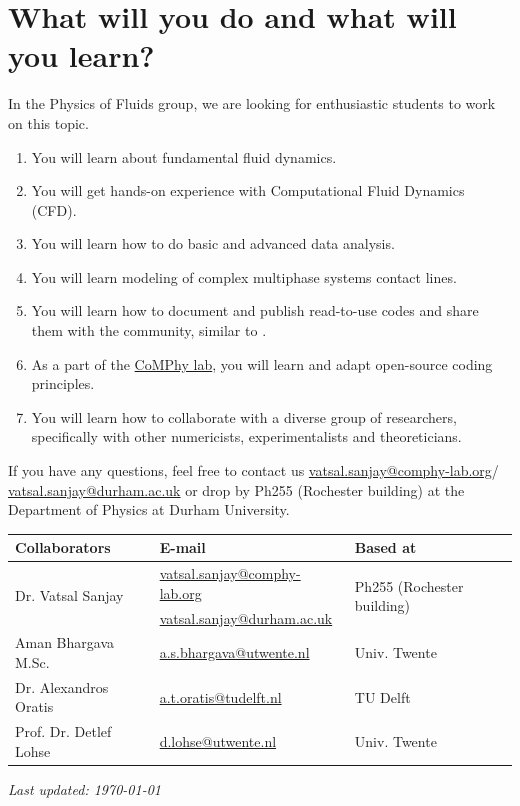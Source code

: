 \documentclass[11pt]{article}
\begin{document}
\section*{What will you do and what will you learn?}
In the Physics of Fluids group, we are looking for enthusiastic students to work on this topic.
\begin{enumerate}
\itemsep0em
\item You will learn about fundamental fluid dynamics.
\item You will get hands-on experience with Computational Fluid Dynamics (CFD).
\item You will learn how to do basic and advanced data analysis.
\item You will learn modeling of complex multiphase systems contact lines. 
\item You will learn how to document and publish read-to-use codes and share them with the community, similar to \citet{basiliskVatsal, basiliskVatsalDropFilm, basiliskVatsalViscousBouncing}. 
\item As a part of the \href{https://comphy-lab.org}{CoMPhy lab}, you will learn and adapt open-source coding principles. 
\item You will learn how to collaborate with a diverse group of researchers, specifically with other numericists, experimentalists and theoreticians.
\end{enumerate}

If you have any questions, feel free to contact us \href{mailto:vatsal.sanjay@comphy-lab.org}{vatsal.sanjay@comphy-lab.org}/\\\href{mailto:vatsal.sanjay@durham.ac.uk}{vatsal.sanjay@durham.ac.uk} or drop by Ph255 (Rochester building) at the Department of Physics at Durham University.

\begin{center}
\begin{tabular}{|l|l|l|}
\hline \textbf{Collaborators} & \textbf{E-mail} & \textbf{Based at} \\
\hline \multirow{2}{*}{Dr. Vatsal Sanjay} & \href{mailto:vatsal.sanjay@comphy-lab.org}{vatsal.sanjay@comphy-lab.org} & \multirow{2}{*}{Ph255 (Rochester building)} \\
& \href{mailto:vatsal.sanjay@durham.ac.uk}{vatsal.sanjay@durham.ac.uk} & \\
\hline Aman Bhargava M.Sc. & \href{mailto:a.s.bhargava@utwente.nl}{a.s.bhargava@utwente.nl} & Univ. Twente \\
\hline Dr. Alexandros Oratis   & \href{mailto:a.t.oratis@tudelft.nl}{a.t.oratis@tudelft.nl}& TU Delft \\
\hline Prof. Dr. Detlef Lohse & \href{mailto:d.lohse@utwente.nl}{d.lohse@utwente.nl} & Univ. Twente  \\
\hline
\end{tabular}
\end{center}

\vspace{1em}
\noindent\textit{Last updated: \today}

\printbibliography
\end{document}
